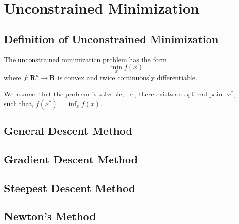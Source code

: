 \chapter{Unconstrained Minimization}

\section{Definition of Unconstrained Minimization}

\begin{definition}
    The unconstrained minimization problem has the form
    \begin{equation}
        \min_x f(x)
    \end{equation}
    where $f:\mathbf{R}^n\rightarrow\mathbf{R}$ is convex and twice continuously differentiable.
\end{definition}

\begin{note}
    We assume that the problem is solvable, i.e., there exists an optimal point $x^*$, such that, $f(x^*)=\inf_x f(x)$.
\end{note}

\begin{example}

\end{example}

\begin{example}

\end{example}

\begin{example}

\end{example}

\begin{example}

\end{example}

\section{General Descent Method}

\section{Gradient Descent Method}

\section{Steepest Descent Method}

\section{Newton's Method}